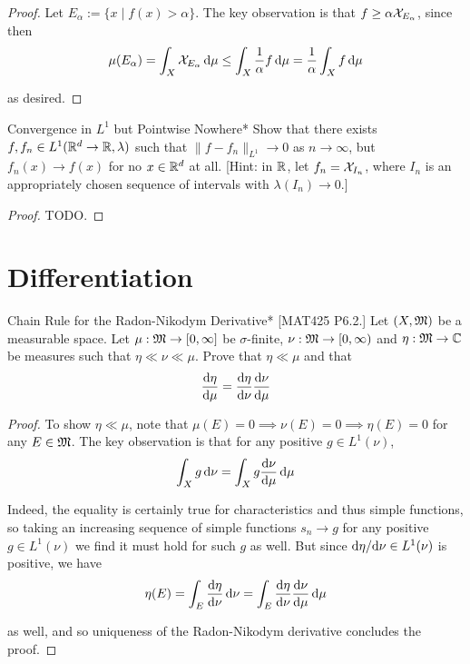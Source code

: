 \begin{proof}
    Let $E_{\alpha} := \{x \mid f(x) > \alpha\}$. The key observation is that $f \geq \alpha \mathcal{X}_{E_\alpha}$, since then
    $$
        \mu(E_\alpha) = \int_X \mathcal{X}_{E_\alpha} \, \mathrm{d}\mu 
        \leq \int_X \frac{1}{\alpha} f \, \mathrm{d} \mu 
        = \frac{1}{\alpha} \int_X f \, \mathrm{d} \mu
    $$

    as desired. 
\end{proof}

\begin{problem}{Convergence in $L^1$ but Pointwise Nowhere}*
    Show that there exists $f, f_n \in L^1(\mathbb{R}^d \to \mathbb{R}, \lambda)$ such that $\|f - f_n\|_{L^1} \to 0$ as $n \to \infty$, but $f_n(x) \to f(x)$ for no $x \in \mathbb{R}^d$ at all. [Hint: in $\mathbb{R}$, let $f_n = \mathcal{X}_{I_n}$, where $I_n$ is an appropriately chosen sequence of intervals with $\lambda(I_n) \to 0$.]
\end{problem}

\begin{proof}
    TODO. 
\end{proof}

\newpage
\section{Differentiation}

\begin{problem}{Chain Rule for the Radon-Nikodym Derivative}*
    [MAT425 P6.2.] Let $(X, \mathfrak{M})$ be a measurable space. Let $\mu : \mathfrak{M} \to [0, \infty]$ be $\sigma$-finite, $\nu : \mathfrak{M} \to [0, \infty)$ and $\eta : \mathfrak{M} \to \mathbb{C}$ be measures such that $\eta \ll \nu \ll \mu$. Prove that $\eta \ll \mu$ and that 
    $$
        \frac{\mathrm{d}\eta}{\mathrm{d}\mu} = \frac{\mathrm{d}\eta}{\mathrm{d}\nu} \frac{\mathrm{d}\nu}{\mathrm{d}\mu}
    $$
\end{problem}

\begin{proof}
    To show $\eta \ll \mu$, note that $\mu(E) = 0 \implies \nu(E) = 0 \implies \eta(E) = 0$ for any $E \in \mathfrak{M}$. The key observation is that for any positive $g \in L^1(\nu)$, 
    $$
        \int_X g \, \mathrm{d}\nu = \int_X g \frac{\mathrm{d}\nu}{\mathrm{d}\mu} \, \mathrm{d}\mu
    $$

    Indeed, the equality is certainly true for characteristics and thus simple functions, so taking an increasing sequence of simple functions $s_n \to g$ for any positive $g \in L^1(\nu)$ we find it must hold for such $g$ as well. But since $\mathrm{d}\eta / \mathrm{d}\nu \in L^1(\nu)$ is positive, we have 
    $$
        \eta(E) = \int_E \frac{\mathrm{d}\eta}{\mathrm{d}\nu} \, \mathrm{d}\nu = \int_E \frac{\mathrm{d}\eta}{\mathrm{d}\nu} \frac{\mathrm{d}\nu}{\mathrm{d}\mu} \, \mathrm{d}\mu
    $$

    as well, and so uniqueness of the Radon-Nikodym derivative concludes the proof. 
\end{proof}

